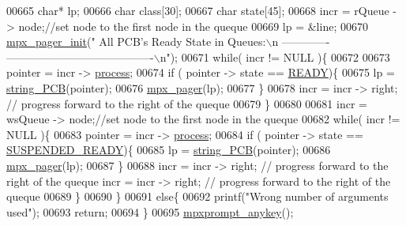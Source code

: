\begin{DoxyCode}
{{{{{00665                 \textcolor{keywordtype}{char}* lp;
00666                 \textcolor{keywordtype}{char} \textcolor{keyword}{class}[30];
00667                 \textcolor{keywordtype}{char} state[45];
00668                 incr = rQueue -> node;\textcolor{comment}{//set node to the first node in the queque}
00669                 lp = &line;
00670                 \hyperlink{mpx__util_8c_a60afdb7496b6ff469c6b98d2ecde15ed}{mpx_pager_init}(\textcolor{stringliteral}{" All PCB's Ready State in Queues:\(\backslash\)n -------------
      ----------------------------------------\(\backslash\)n"});
00671                 \textcolor{keywordflow}{while}( incr != NULL )\{
00672                         
00673                         pointer = incr -> \hyperlink{structprocess}{process};
00674                         \textcolor{keywordflow}{if} ( pointer -> state == \hyperlink{mpx__r2_8h_ad1235d5ce36f7267285e82dccd428aa6}{READY})\{
00675                         lp = \hyperlink{mpx__r2_8c_aa1ebf78ebfc66e910acd6efdcf6b2437}{string_PCB}(pointer);
00676                         \hyperlink{mpx__util_8c_a9e59881f10bd91d7255f18f205e101e6}{mpx_pager}(lp);
00677                         \}
00678                         incr = incr -> right; \textcolor{comment}{// progress forward to the right of
       the queque}
00679                 \}
00680                 
00681                 incr = wsQueue -> node;\textcolor{comment}{//set node to the first node in the queque
      }
00682                 \textcolor{keywordflow}{while}( incr != NULL )\{
00683                         pointer = incr -> \hyperlink{structprocess}{process};
00684                         \textcolor{keywordflow}{if} ( pointer -> state == \hyperlink{mpx__r2_8h_a07b1141143e8825b04670da23fca8cc7}{SUSPENDED_READY})\{
00685                         lp = \hyperlink{mpx__r2_8c_aa1ebf78ebfc66e910acd6efdcf6b2437}{string_PCB}(pointer);
00686                         \hyperlink{mpx__util_8c_a9e59881f10bd91d7255f18f205e101e6}{mpx_pager}(lp);
00687                         \}
00688                         incr = incr -> right; \textcolor{comment}{// progress forward to the right of
       the queque                     incr = incr -> right; // progress forward to the 
      right of the queque}
00689                 \}
00690         \}
00691         \textcolor{keywordflow}{else}\{
00692                 printf(\textcolor{stringliteral}{"Wrong number of arguments used"});       
00693                 \textcolor{keywordflow}{return};
00694         \}
00695         \hyperlink{mpx__util_8c_a338d01dfe3c80732c00450203c85b964}{mpxprompt_anykey}();
}}}}}
\end{DoxyCode}
